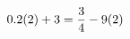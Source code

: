 \documentclass[preview]{standalone}
\begin{document}
\begin{align*}
\special{dvisvgm:raw <g id='unique000'>}0.2(2) + 3 = \frac{3}{4} - 9(2)\special{dvisvgm:raw </g>}
\end{align*}
\end{document}
